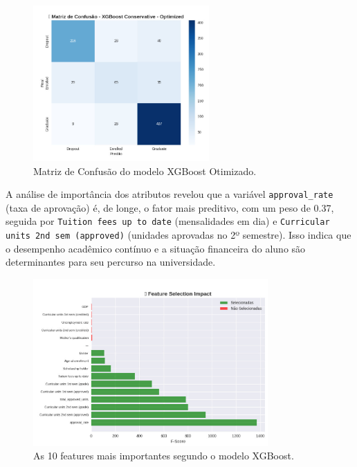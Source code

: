 \documentclass[12pt]{article}
\begin{document}
\begin{figure}[h!]
\centering
\includegraphics[width=0.6\textwidth]{images/matriz_confusao.jpg}
\caption{Matriz de Confusão do modelo XGBoost Otimizado.}
\label{fig:matriz_confusao}
\end{figure}
\clearpage

A análise de importância dos atributos revelou que a variável \texttt{approval\_rate} (taxa de aprovação) é, de longe, o fator mais preditivo, com um peso de 0.37, seguida por \texttt{Tuition fees up to date} (mensalidades em dia) e \texttt{Curricular units 2nd sem (approved)} (unidades aprovadas no 2º semestre). Isso indica que o desempenho acadêmico contínuo e a situação financeira do aluno são determinantes para seu percurso na universidade.

\begin{figure}[h!]
\centering
\includegraphics[width=0.8\textwidth]{images/feature_importance.jpg}
\caption{As 10 features mais importantes segundo o modelo XGBoost.}
\label{fig:feature_importance}
\end{figure}
\end{document}
